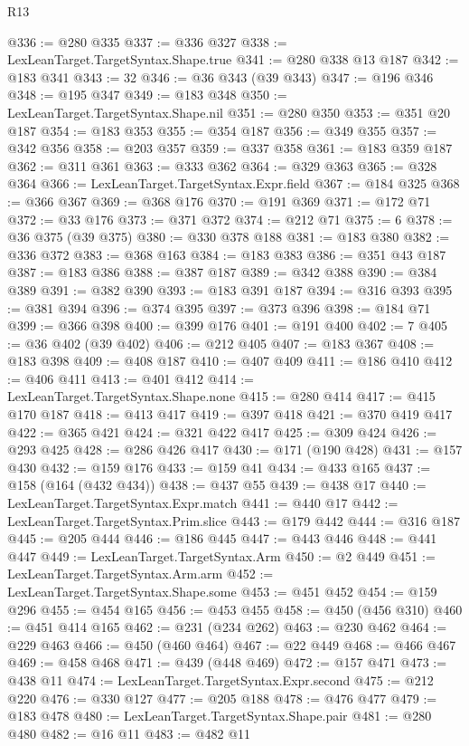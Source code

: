 \begin{lexlean}{R13}
\begin{coremodule}
@336 := @280 @335
@337 := @336 @327
@338 := LexLeanTarget.TargetSyntax.Shape.true
@341 := @280 @338 @13 @187
@342 := @183 @341
@343 := 32
@346 := @36 @343 (@39 @343)
@347 := @196 @346
@348 := @195 @347
@349 := @183 @348
@350 := LexLeanTarget.TargetSyntax.Shape.nil
@351 := @280 @350
@353 := @351 @20 @187
@354 := @183 @353
@355 := @354 @187
@356 := @349 @355
@357 := @342 @356
@358 := @203 @357
@359 := @337 @358
@361 := @183 @359 @187
@362 := @311 @361
@363 := @333 @362
@364 := @329 @363
@365 := @328 @364
@366 := LexLeanTarget.TargetSyntax.Expr.field
@367 := @184 @325
@368 := @366 @367
@369 := @368 @176
@370 := @191 @369
@371 := @172 @71
@372 := @33 @176
@373 := @371 @372
@374 := @212 @71
@375 := 6
@378 := @36 @375 (@39 @375)
@380 := @330 @378 @188
@381 := @183 @380
@382 := @336 @372
@383 := @368 @163
@384 := @183 @383
@386 := @351 @43 @187
@387 := @183 @386
@388 := @387 @187
@389 := @342 @388
@390 := @384 @389
@391 := @382 @390
@393 := @183 @391 @187
@394 := @316 @393
@395 := @381 @394
@396 := @374 @395
@397 := @373 @396
@398 := @184 @71
@399 := @366 @398
@400 := @399 @176
@401 := @191 @400
@402 := 7
@405 := @36 @402 (@39 @402)
@406 := @212 @405
@407 := @183 @367
@408 := @183 @398
@409 := @408 @187
@410 := @407 @409
@411 := @186 @410
@412 := @406 @411
@413 := @401 @412
@414 := LexLeanTarget.TargetSyntax.Shape.none
@415 := @280 @414
@417 := @415 @170 @187
@418 := @413 @417
@419 := @397 @418
@421 := @370 @419 @417
@422 := @365 @421
@424 := @321 @422 @417
@425 := @309 @424
@426 := @293 @425
@428 := @286 @426 @417
@430 := @171 (@190 @428)
@431 := @157 @430
@432 := @159 @176
@433 := @159 @41
@434 := @433 @165
@437 := @158 (@164 (@432 @434))
@438 := @437 @55
@439 := @438 @17
@440 := LexLeanTarget.TargetSyntax.Expr.match
@441 := @440 @17
@442 := LexLeanTarget.TargetSyntax.Prim.slice
@443 := @179 @442
@444 := @316 @187
@445 := @205 @444
@446 := @186 @445
@447 := @443 @446
@448 := @441 @447
@449 := LexLeanTarget.TargetSyntax.Arm
@450 := @2 @449
@451 := LexLeanTarget.TargetSyntax.Arm.arm
@452 := LexLeanTarget.TargetSyntax.Shape.some
@453 := @451 @452
@454 := @159 @296
@455 := @454 @165
@456 := @453 @455
@458 := @450 (@456 @310)
@460 := @451 @414 @165
@462 := @231 (@234 @262)
@463 := @230 @462
@464 := @229 @463
@466 := @450 (@460 @464)
@467 := @22 @449
@468 := @466 @467
@469 := @458 @468
@471 := @439 (@448 @469)
@472 := @157 @471
@473 := @438 @11
@474 := LexLeanTarget.TargetSyntax.Expr.second
@475 := @212 @220
@476 := @330 @127
@477 := @205 @188
@478 := @476 @477
@479 := @183 @478
@480 := LexLeanTarget.TargetSyntax.Shape.pair
@481 := @280 @480
@482 := @16 @11
@483 := @482 @11

\end{coremodule}
\end{lexlean}
